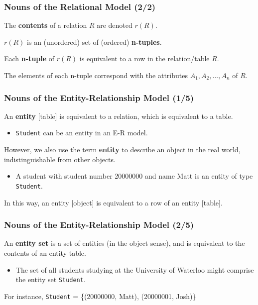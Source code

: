 \begin{frame}
\frametitle{Nouns of the Relational Model (2/2)}

The \textbf{contents} of a relation $R$ are denoted $r(R)$.

$r(R)$ is an (unordered) set of (ordered) \textbf{n-tuples}.

Each \textbf{n-tuple} of $r(R)$ is equivalent to a row in the relation/table $R$.

The elements of each n-tuple correspond with the attributes $A_1, A_2, ... , A_n$ of $R$.

\end{frame}

\begin{frame}
\frametitle{Nouns of the Entity-Relationship Model (1/5)}

An \textbf{entity} [table] is equivalent to a relation, which is equivalent to a table.\\
\begin{itemize}
  \item \texttt{Student} can be an entity in an E-R model.
\end{itemize}

However, we also use the term \textbf{entity} to describe an object in the real world, indistinguishable from other objects.\\
\begin{itemize}
  \item A student with student number 20000000 and name Matt is an entity of type \texttt{Student}.
\end{itemize}

In this way, an entity [object] is equivalent to a row of an entity [table].

\end{frame}


\begin{frame}
\frametitle{Nouns of the Entity-Relationship Model (2/5)}

An \textbf{entity set} is a set of entities (in the object sense), and is equivalent to the contents of an entity table.\\
\begin{itemize}
  \item The set of all students studying at the University of Waterloo might comprise the entity set \texttt{Student}.
\end{itemize}

For instance, \texttt{Student} = \{(20000000, Matt), (20000001, Josh)\}

\end{frame}


